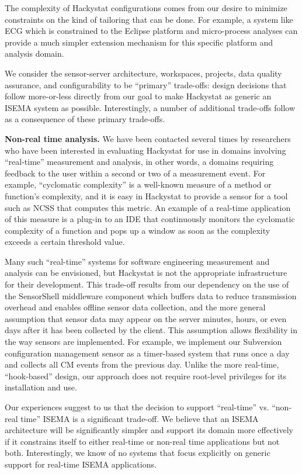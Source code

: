 \documentclass[10pt,twocolumn]{article}
\begin{document}
The complexity of Hackystat configurations comes from our desire to
minimize constraints on the kind of tailoring that can be done.  For
example, a system like ECG which is constrained to the Eclipse platform and
micro-process analyses can provide a much simpler extension mechanism for
this specific platform and analysis domain.


We consider the sensor-server architecture, workspaces, projects, data
quality assurance, and configurability to be ``primary'' trade-offs: design
decisions that follow more-or-less directly from our goal to make Hackystat
as generic an ISEMA system as possible.  Interestingly, a number of
additional trade-offs follow as a consequence of these primary trade-offs.

{\bf Non-real time analysis.}  We have been contacted several times by
researchers who have been interested in evaluating Hackystat for use in
domains involving ``real-time'' measurement and analysis, in other words, a
domains requiring feedback to the user within a second or two of a
measurement event.  For example, ``cyclomatic complexity'' is a well-known
measure of a method or function's complexity, and it is easy in Hackystat
to provide a sensor for a tool such as NCSS that computes this metric.  An
example of a real-time application of this measure is a plug-in to an
IDE that continuously monitors the cyclomatic complexity of a function and
pops up a window as soon as the complexity exceeds a certain threshold
value.

Many such ``real-time'' systems for software engineering measurement and
analysis can be envisioned, but Hackystat is not the appropriate
infrastructure for their development.  This trade-off results from our
dependency on the use of the SensorShell middleware component which buffers
data to reduce transmission overhead and enables offline sensor data
collection, and the more general assumption that sensor data may appear on
the server minutes, hours, or even days after it has been collected by the
client. This assumption allows flexibility in the way sensors are
implemented.  For example, we implement our Subversion configuration
management sensor as a timer-based system that runs once a day and collects
all CM events from the previous day.  Unlike the more real-time,
``hook-based'' design, our approach does not require root-level privileges
for its installation and use. 

Our experiences suggest to us that the decision to support ``real-time''
vs.  ``non-real time'' ISEMA is a significant trade-off.  We believe that an
ISEMA architecture will be significantly simpler and support its domain
more effectively if it constrains itself to either real-time or non-real
time applications but not both.  Interestingly, we know of no systems that
focus explicitly on generic support for real-time ISEMA applications.
\end{document}
